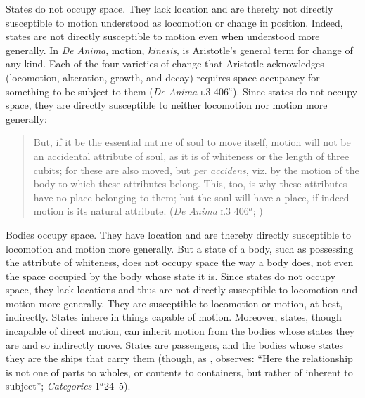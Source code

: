 States do not occupy space. They lack location and are there\-by not directly susceptible to motion understood as locomotion or change in position. Indeed, states are not directly susceptible to motion even when understood more generally. In \emph{De Anima}, motion, \emph{kinēsis}, is Aristotle's general term for change of any kind. Each of the four varieties of change that Aristotle acknowledges (locomotion, alteration, growth, and decay) requires space occupancy for something to be subject to them (\emph{De Anima} \textsc{i}.3 406\( ^{a} \)). Since states do not occupy space, they are directly susceptible to neither locomotion nor motion more generally:
\begin{quote}
	But, if it be the essential nature of soul to move itself, motion will not be an accidental attribute of soul, as it is of whiteness or the length of three cubits; for these are also moved, but \emph{per accidens}, viz. by the motion of the body to which these attributes belong. This, too, is why these attributes have no place belonging to them; but the soul will have a place, if indeed motion is its natural attribute. (\emph{De Anima} \textsc{i}.3 406\( ^{a} \); \citealt[21]{Hicks:1907uq})
\end{quote}
Bodies occupy space. They have location and are there\-by directly susceptible to locomotion and motion more generally. But a state of a body, such as possessing the attribute of whiteness, does not occupy space the way a body does, not even the space occupied by the body whose state it is. Since states do not occupy space, they lack locations and thus are not directly susceptible to locomotion and motion more generally. They are susceptible to locomotion or motion, at best, indirectly. States inhere in things capable of motion. Moreover, states, though incapable of direct motion, can inherit motion from the bodies whose states they are and so indirectly move.  States are passengers, and the bodies whose states they are the ships that carry them (though, as \citealt[174]{Witt:1995kx}, observes: ``Here the relationship is not one of parts to wholes, or contents to containers, but rather of inherent to subject''; \emph{Categories} 1\( ^{a} \)24--5).

